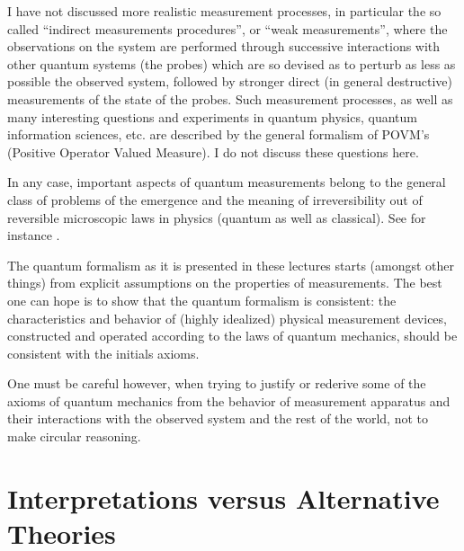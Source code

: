 I have not discussed more realistic measurement processes, in particular the so called ``indirect measurements procedures'', or ``weak measurements'', where the observations on the system are performed through successive interactions with other quantum systems (the probes) which are so devised as to perturb as less as possible the observed system, followed by stronger direct (in general destructive) measurements of the state of the probes.
Such measurement processes, as well as many interesting questions and experiments in quantum physics, quantum information sciences, etc. are described by the general formalism of POVM's (Positive Operator Valued Measure). I do not discuss these questions here.

In any case,  important aspects of quantum measurements belong to the general class of problems of the emergence and the meaning of irreversibility out of reversible microscopic laws in physics (quantum as well as classical). See for instance 
\cite{Halliwell96}.

The quantum formalism as it is presented in these lectures starts (amongst other things) from explicit assumptions on the properties of measurements. The best one can hope is to show that the quantum formalism is consistent: the characteristics and behavior of (highly idealized) physical measurement devices, constructed and operated according to the laws of quantum mechanics, should be consistent with the initials axioms. 

One must be careful however, when trying to justify or rederive some of the axioms of quantum mechanics from the behavior of measurement apparatus and their interactions with the observed system and the rest of the world, not to make circular reasoning. 


\section{Interpretations versus Alternative Theories }

